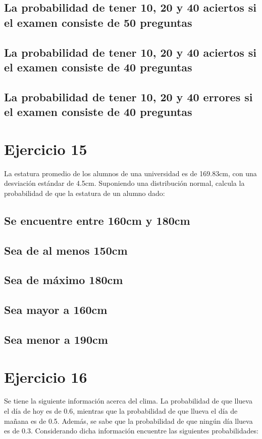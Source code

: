 \documentclass[12pt]{article}
\begin{document}
\subsection{La probabilidad de tener 10, 20 y 40 aciertos si el examen consiste de 50 preguntas}
\subsection{La probabilidad de tener 10, 20 y 40 aciertos si el examen consiste de 40 preguntas}
\subsection{La probabilidad de tener 10, 20 y 40 errores si el examen consiste de 40 preguntas}
\section{Ejercicio 15}
La estatura promedio de los alumnos de una universidad es de 169.83cm, con una desviación
estándar de 4.5cm. Suponiendo una distribución normal, calcula la probabilidad de que la
estatura de un alumno dado:
\subsection{Se encuentre entre 160cm y 180cm}
\subsection{Sea de al menos 150cm}
\subsection{Sea de máximo 180cm}
\subsection{Sea mayor a 160cm}
\subsection{Sea menor a 190cm}
\section{Ejercicio 16}
Se tiene la siguiente información acerca del clima. La probabilidad de que llueva el día de hoy
es de 0.6, mientras que la probabilidad de que llueva el día de mañana es de 0.5. Además, se
sabe que la probabilidad de que ningún día llueva es de 0.3. Considerando dicha información
encuentre las siguientes probabilidades:
\end{document}

